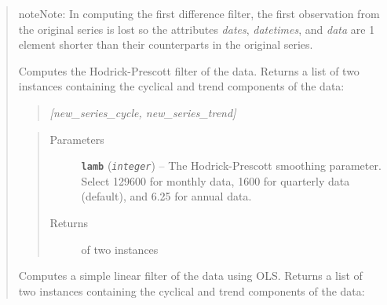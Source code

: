 \documentclass[letterpaper,10pt,openany,oneside]{sphinxmanual}
\begin{document}
\begin{fulllineitems}
\begin{quote}
\begin{fulllineitems}
\begin{quote}
\begin{description}
\end{description}\end{quote}

\begin{notice}{note}{Note:}
In computing the first difference filter, the first observation from the original series is lost so the attributes \emph{dates}, \emph{datetimes}, and \emph{data} are 1 element shorter than their counterparts in the original series.
\end{notice}

\end{fulllineitems}


\begin{fulllineitems}
\label{series_class:fredpy.series.hpfilter}
Computes the Hodrick-Prescott filter of the data. Returns a list of two {\hyperref[series_class:fredpy.series]{}} instances containing the cyclical and trend components of the data:
\begin{quote}

\emph{{[}new\_series\_cycle, new\_series\_trend{]}}
\end{quote}
\begin{quote}\begin{description}
\item[{Parameters}] \leavevmode
\textbf{\texttt{lamb}} (\emph{\texttt{integer}}) -- The Hodrick-Prescott smoothing parameter. Select 129600 for monthly data, 1600 for quarterly data (default), and 6.25 for annual data.

\item[{Returns}] \leavevmode
\href{https://docs.python.org/library/functions.html\#list}{} of two {\hyperref[series_class:fredpy.series]{}} instances

\end{description}\end{quote}

\end{fulllineitems}


\begin{fulllineitems}
\label{series_class:fredpy.series.lintrend}
Computes a simple linear filter of the data using OLS. Returns a list of two {\hyperref[series_class:fredpy.series]{}} instances containing the cyclical and trend components of the data:
\begin{quote}


\end{quote}
\end{fulllineitems}
\end{quote}
\end{fulllineitems}
\end{document}
